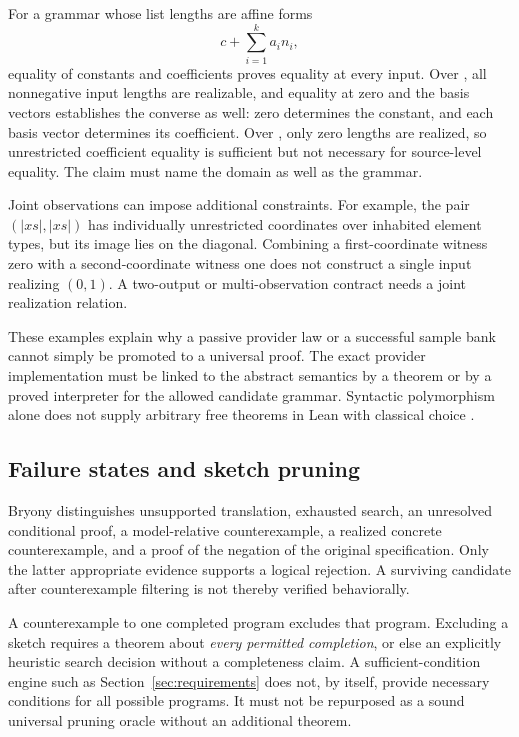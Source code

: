\documentclass[11pt,a4paper]{article}
\newcommand{\code}[1]{\texttt{\detokenize{#1}}}
\theoremstyle{definition}\newtheorem{definition}[theorem]{Definition}
\theoremstyle{remark}\newtheorem{remark}[theorem]{Remark}
\begin{document}
For a grammar whose list lengths are affine forms
\[
 c+\sum_{i=1}^k a_i n_i,
\]
equality of constants and coefficients proves equality at every input. Over \code{List Nat}, all nonnegative input lengths are realizable, and equality at zero and the basis vectors establishes the converse as well: zero determines the constant, and each basis vector determines its coefficient. Over \code{List Empty}, only zero lengths are realized, so unrestricted coefficient equality is sufficient but not necessary for source-level equality. The claim must name the domain as well as the grammar.

Joint observations can impose additional constraints. For example, the pair $(|xs|,|xs|)$ has individually unrestricted coordinates over inhabited element types, but its image lies on the diagonal. Combining a first-coordinate witness zero with a second-coordinate witness one does not construct a single input realizing $(0,1)$. A two-output or multi-observation contract needs a joint realization relation.

These examples explain why a passive provider law or a successful sample bank cannot simply be promoted to a universal proof. The exact provider implementation must be linked to the abstract semantics by a theorem or by a proved interpreter for the allowed candidate grammar. Syntactic polymorphism alone does not supply arbitrary free theorems in Lean with classical choice \cite{leanaxioms}.

\subsection{Failure states and sketch pruning}
Bryony distinguishes unsupported translation, exhausted search, an unresolved conditional proof, a model-relative counterexample, a realized concrete counterexample, and a proof of the negation of the original specification. Only the latter appropriate evidence supports a logical rejection. A surviving candidate after counterexample filtering is not thereby verified behaviorally.

A counterexample to one completed program excludes that program. Excluding a sketch requires a theorem about \emph{every permitted completion}, or else an explicitly heuristic search decision without a completeness claim. A sufficient-condition engine such as Section~\ref{sec:requirements} does not, by itself, provide necessary conditions for all possible programs. It must not be repurposed as a sound universal pruning oracle without an additional theorem.
\end{document}
